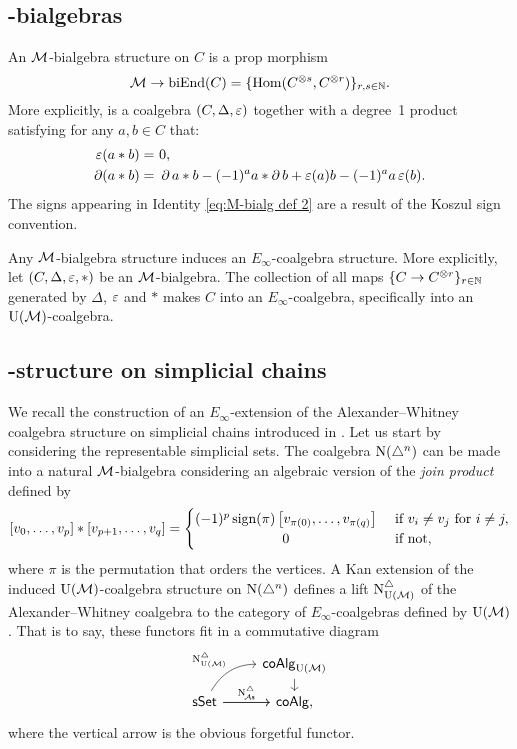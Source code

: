 \subsection{\pdfM-bialgebras}

An $\mathcal{M}$-bialgebra structure on $C$ is a prop morphism
\[
\mathcal{M} \to \mathrm{biEnd}(C) = \{\mathrm{Hom}(C^{\otimes s}, C^{\otimes r})\}_{r,s\in\mathbb{N}}.
\]
More explicitly, is a coalgebra $(C, \Delta, \operatorname{\varepsilon})$ together with a degree~1 product satisfying for any $a,b \in C$ that:
\begin{align}
	\label{eq:M-bialg def 1}
	\operatorname{\varepsilon}(a \ast b) =\ & 0, \\
	\label{eq:M-bialg def 2}
	\operatorname{\partial} (a \ast b) =\ & \operatorname{\partial} a \ast b - (-1)^{a} a \ast \operatorname{\partial} b + \operatorname{\varepsilon}(a) b - (-1)^{a} a \operatorname{\varepsilon}(b).
\end{align}
The signs appearing in Identity \eqref{eq:M-bialg def 2} are a result of the Koszul sign convention.

Any $\mathcal{M}$-bialgebra structure induces an $E_\infty$-coalgebra structure.
More explicitly, let $(C, \Delta, \operatorname{\varepsilon}, \ast)$ be an $\mathcal{M}$-bialgebra.
The collection of all maps $\{C \to C^{\otimes r}\}_{r \in \mathbb{N}}$ generated by $\Delta$, $\operatorname{\varepsilon}$ and $\ast$ makes $C$ into an $E_\infty$-coalgebra, specifically into an ${\operatorname{U}(\mathcal{M})}$-coalgebra.

\subsection{\pdfEinfty-structure on simplicial chains}

We recall the construction of an $E_\infty$-extension of the Alexander--Whitney coalgebra structure on simplicial chains introduced in \cite{medina2020prop1}.
Let us start by considering the representable simplicial sets.
The coalgebra $\operatorname{N}(\triangle^n)$ can be made into a natural $\mathcal{M}$-bialgebra considering an algebraic version of the \textit{join product} defined by
\begin{equation*}
	\left[v_0, \dots, v_p \right] \ast \left[v_{p+1}, \dots, v_q\right] =
	\begin{cases}
		(-1)^{p} \sign(\pi) \left[v_{\pi(0)}, \dots, v_{\pi(q)}\right] &
		\text{ if } v_i \neq v_j \text{ for } i \neq j, \\
		\hfil 0 & \text{ if not},
	\end{cases}
\end{equation*}
where $\pi$ is the permutation that orders the vertices.
A Kan extension of the induced ${\operatorname{U}(\mathcal{M})}$-coalgebra structure on $\operatorname{N}(\triangle^n)$ defines a lift $\operatorname{N^{\triangle}_{{\operatorname{U}(\mathcal{M})}}}$ of the Alexander--Whitney coalgebra to the category of $E_\infty$-coalgebras defined by ${\operatorname{U}(\mathcal{M})}$.
That is to say, these functors fit in a commutative diagram
\begin{equation*}
	\begin{tikzcd}[column sep=normal, row sep=small]
		& \coAlg_{\UM} \arrow[d] \\
		\sSet \arrow[r]
		\arrow[ur,out=60, in=180, "\schainsUM"]
		\arrow[r, "\schainsA"]
		& \coAlg,
	\end{tikzcd}
\end{equation*}
where the vertical arrow is the obvious forgetful functor.

